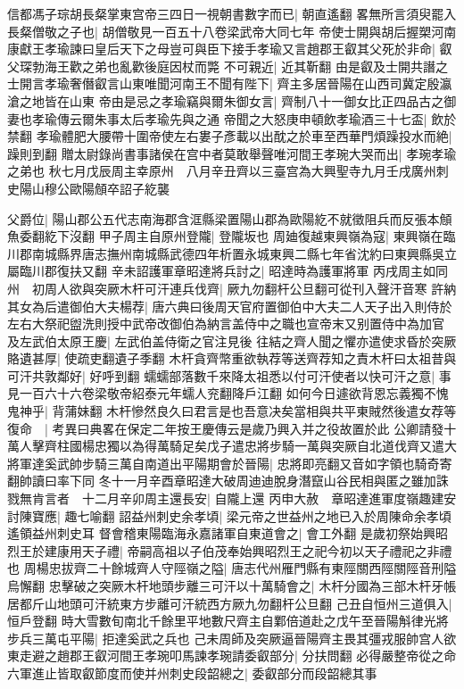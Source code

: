 信都馮子琮胡長粲掌東宫帝三四日一視朝書數字而已|{
	朝直遙翻}
畧無所言須臾罷入長粲僧敬之子也|{
	胡僧敬見一百五十八卷梁武帝大同七年}
帝使士開與胡后握槊河南康獻王孝瑜諫曰皇后天下之母豈可與臣下接手孝瑜又言趙郡王叡其父死於非命|{
	叡父琛勃海王歡之弟也亂歡後庭因杖而斃}
不可親近|{
	近其靳翻}
由是叡及士開共譖之士開言孝瑜奢僭叡言山東唯聞河南王不聞有陛下|{
	齊主多居晉陽在山西司冀定殷瀛滄之地皆在山東}
帝由是忌之孝瑜竊與爾朱御女言|{
	齊制八十一御女比正四品古之御妻也孝瑜傳云爾朱事太后孝瑜先與之通}
帝聞之大怒庚申頓飲孝瑜酒三十七盃|{
	飲於禁翻}
孝瑜體肥大腰帶十圍帝使左右婁子彥載以出酖之於車至西華門煩躁投水而絶|{
	躁則到翻}
贈太尉錄尚書事諸侯在宫中者莫敢舉聲唯河間王孝琬大哭而出|{
	孝琬孝瑜之弟也}
秋七月戊辰周主幸原州　八月辛丑齊以三臺宫為大興聖寺九月壬戌廣州刺史陽山穆公歐陽頠卒詔子紇襲

父爵位|{
	陽山郡公五代志南海郡含洭縣梁置陽山郡為歐陽紇不就徵阻兵而反張本頠魚委翻紇下沒翻}
甲子周主自原州登隴|{
	登隴坂也}
周廸復越東興嶺為寇|{
	東興嶺在臨川郡南城縣界唐志撫州南城縣武德四年析置永城東興二縣七年省沈約曰東興縣吳立屬臨川郡復扶又翻}
辛未詔護軍章昭達將兵討之|{
	昭達時為護軍將軍}
丙戌周主如同州　初周人欲與突厥木杆可汗連兵伐齊|{
	厥九勿翻杆公旦翻可從刊入聲汗音寒}
許納其女為后遣御伯大夫楊荐|{
	唐六典曰後周天官府置御伯中大夫二人天子出入則侍於左右大祭祀盥洗則授中武帝改御伯為納言盖侍中之職也宣帝末又别置侍中為加官}
及左武伯太原王慶|{
	左武伯盖侍衛之官注見後}
往結之齊人聞之懼亦遣使求昏於突厥賂遺甚厚|{
	使疏吏翻遺子季翻}
木杆貪齊幣重欲執荐等送齊荐知之責木杆曰太祖昔與可汗共敦鄰好|{
	好呼到翻}
蠕蠕部落數千來降太祖悉以付可汗使者以快可汗之意|{
	事見一百六十六卷梁敬帝紹泰元年蠕人兖翻降戶江翻}
如何今日遽欲背恩忘義獨不愧鬼神乎|{
	背蒲妹翻}
木杆慘然良久曰君言是也吾意决矣當相與共平東賊然後遣女荐等復命　|{
	考異曰典畧在保定二年按王慶傳云是歲乃興入并之役故置於此}
公卿請發十萬人擊齊柱國楊忠獨以為得萬騎足矣戊子遣忠將步騎一萬與突厥自北道伐齊又遣大將軍達奚武帥步騎三萬自南道出平陽期會於晉陽|{
	忠將即亮翻又音如字領也騎奇寄翻帥讀曰率下同}
冬十一月辛酉章昭達大破周迪迪脫身潛竄山谷民相與匿之雖加誅戮無肯言者　十二月辛卯周主還長安|{
	自隴上還}
丙申大赦　章昭達進軍度嶺趣建安討陳寶應|{
	趣七喻翻}
詔益州刺史余孝頃|{
	梁元帝之世益州之地已入於周陳命余孝頃遙領益州刺史耳}
督會稽東陽臨海永嘉諸軍自東道會之|{
	會工外翻}
是歲初祭始興昭烈王於建康用天子禮|{
	帝嗣高祖以子伯茂奉始興昭烈王之祀今初以天子禮祀之非禮也}
周楊忠拔齊二十餘城齊人守陘嶺之隘|{
	唐志代州雁門縣有東陘關西陘關陘音刑隘烏懈翻}
忠擊破之突厥木杆地頭步離三可汗以十萬騎會之|{
	木杆分國為三部木杆牙帳居都斤山地頭可汗統東方步離可汗統西方厥九勿翻杆公旦翻}
己丑自恒州三道俱入|{
	恒戶登翻}
時大雪數旬南北千餘里平地數尺齊主自鄴倍道赴之戊午至晉陽斛律光將步兵三萬屯平陽|{
	拒達奚武之兵也}
己未周師及突厥逼晉陽齊主畏其彊戎服帥宫人欲東走避之趙郡王叡河間王孝琬叩馬諫孝琬請委叡部分|{
	分扶問翻}
必得嚴整帝從之命六軍進止皆取叡節度而使并州刺史段韶總之|{
	委叡部分而段韶總其事}


